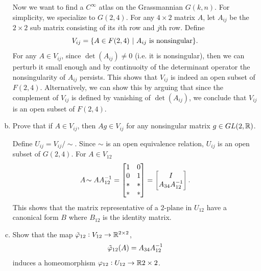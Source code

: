 \begin{problem}
\begin{enumerate}[(a)]
		Now we want to find a $ C^\infty $ atlas on the Grassmannian $ G(k,n) $. For simplicity, we specialize to $ G(2,4) $. For any $ 4\times 2 $ matrix $ A $, let $ A_{ij} $ be the $ 2\times 2 $ sub matrix consisting of its $ i\text{th} $ row and $ j\text{th} $ row. Define
		\[ V_{ij} = \set{A \in F(2,4)\ |\ A_{ij} \text{ is nonsingular}}. \]
		For any $ A \in V_{ij} $, since $ \det(A_{ij}) \neq 0 $ (i.e. it is nonsingular), then we can perturb it small enough and by continuoity of the determinant operator the nonsingularity of $ A_{ij} $ persists. This shows that $ V_{ij} $ is indeed an open subset of $ F(2,4) $. Alternatively, we can show this by arguing that since the complement of $ V_{ij} $ is defined by vanishing of $ \det(A_{ij}) $, we conclude that $ V_{ij} $ is an open subset of $ F(2,4) $.
		
		\item Prove that if $ A \in V_{ij} $, then $ Ag \in V_{ij} $ for any nonsingular matrix $ g \in GL(2,\mathbb{R}) $.
		
		Define $ U_{ij} = V_{ij}/\sim $. Since $ \sim $ is an open equivalence relation, $ U_{ij}$ is an open subset of $ G(2,4) $. For $ A \in V_{12} $
		\[ A \sim A \inv{A}_{12} = 
		\begin{bmatrix}
			1 & 0 \\
			0 & 1 \\
			\ast & \ast \\
			\ast & \ast 
		\end{bmatrix} = 
		\begin{bmatrix}
			I \\
			A_{34}\inv{A}_{12}
		\end{bmatrix}.
		 \]
		 This shows that the matrix representative of a $ 2\text{-plane} $ in $ U_{12} $ have a canonical form $ B $ where $ B_{12} $ is the identity matrix.
		 
		 \item Show that the map $ \tilde{\varphi}_{12}: V_{12} \to \mathbb{R}^{2\times 2} $,
		 \[ \tilde{\varphi}_{12} (A) = A_{34}A^{-1}_{12} \]
		 induces a homeomorphism $ \varphi_{12}: U_{12} \to \mathbb{R}{2\times 2} $.
		
	\end{enumerate}

		
\end{problem}

